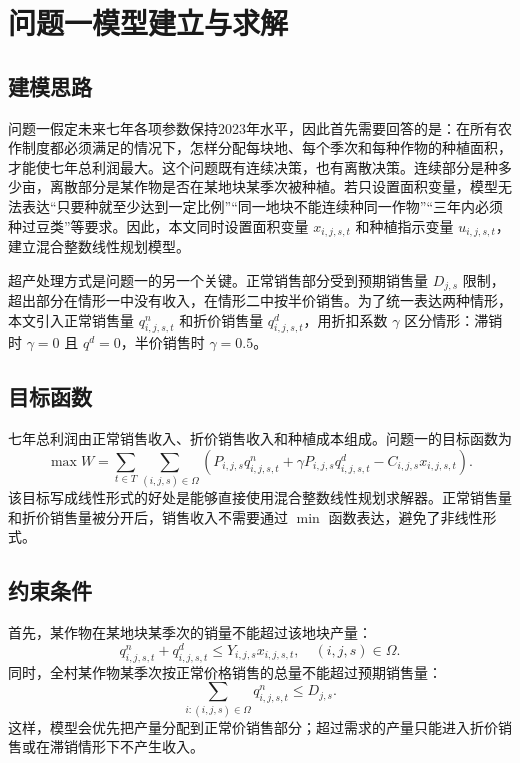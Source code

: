 \section{问题一模型建立与求解}

\subsection{建模思路}

问题一假定未来七年各项参数保持2023年水平，因此首先需要回答的是：在所有农作制度都必须满足的情况下，怎样分配每块地、每个季次和每种作物的种植面积，才能使七年总利润最大。这个问题既有连续决策，也有离散决策。连续部分是种多少亩，离散部分是某作物是否在某地块某季次被种植。若只设置面积变量，模型无法表达“只要种就至少达到一定比例”“同一地块不能连续种同一作物”“三年内必须种过豆类”等要求。因此，本文同时设置面积变量 $x_{i,j,s,t}$ 和种植指示变量 $u_{i,j,s,t}$，建立混合整数线性规划模型。

超产处理方式是问题一的另一个关键。正常销售部分受到预期销售量 $D_{j,s}$ 限制，超出部分在情形一中没有收入，在情形二中按半价销售。为了统一表达两种情形，本文引入正常销售量 $q^n_{i,j,s,t}$ 和折价销售量 $q^d_{i,j,s,t}$，用折扣系数 $\gamma$ 区分情形：滞销时 $\gamma=0$ 且 $q^d=0$，半价销售时 $\gamma=0.5$。

\subsection{目标函数}

七年总利润由正常销售收入、折价销售收入和种植成本组成。问题一的目标函数为
\begin{equation}
\max W=\sum_{t\in T}\sum_{(i,j,s)\in\Omega}
\left(P_{i,j,s}q^n_{i,j,s,t}+\gamma P_{i,j,s}q^d_{i,j,s,t}
-C_{i,j,s}x_{i,j,s,t}\right).
\end{equation}
该目标写成线性形式的好处是能够直接使用混合整数线性规划求解器。正常销售量和折价销售量被分开后，销售收入不需要通过 $\min$ 函数表达，避免了非线性形式。

\subsection{约束条件}

首先，某作物在某地块某季次的销量不能超过该地块产量：
\begin{equation}
q^n_{i,j,s,t}+q^d_{i,j,s,t}\le Y_{i,j,s}x_{i,j,s,t},\quad (i,j,s)\in\Omega.
\end{equation}
同时，全村某作物某季次按正常价格销售的总量不能超过预期销售量：
\begin{equation}
\sum_{i:(i,j,s)\in\Omega}q^n_{i,j,s,t}\le D_{j,s}.
\end{equation}
这样，模型会优先把产量分配到正常价销售部分；超过需求的产量只能进入折价销售或在滞销情形下不产生收入。

